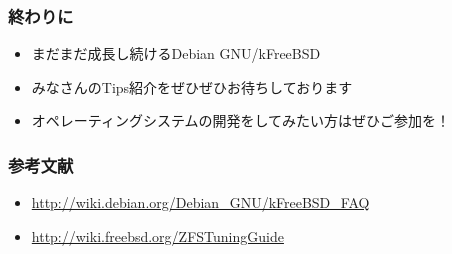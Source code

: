 \documentclass[cjk,dvipdfmx,12pt,%
hyperref={bookmarks=true,bookmarksnumbered=true,bookmarksopen=false,%
colorlinks=false,%
pdftitle={Debian GNU/kFreeBSD で便利に暮らすための Tips},%
pdfauthor={杉本典充},%
pdfsubject={第43回関西Debian勉強会},%
}]{beamer}
\begin{document}
\begin{frame}[fragile]
\frametitle{終わりに}
\begin{itemize}
  \item まだまだ成長し続けるDebian GNU/kFreeBSD
  \item みなさんのTips紹介をぜひぜひお待ちしております
  \item オペレーティングシステムの開発をしてみたい方はぜひご参加を！
\end{itemize}
\end{frame}

\begin{frame}[fragile]
\frametitle{参考文献}
\begin{itemize}
\item \url{http://wiki.debian.org/Debian_GNU/kFreeBSD_FAQ}
\item \url{http://wiki.freebsd.org/ZFSTuningGuide}
\end{itemize}
\end{frame}
\end{document}
